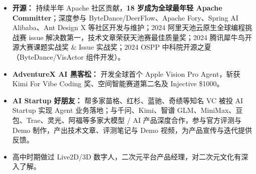 \documentclass[10pt]{article}
\begin{document}
\begin{itemize}
\item \textbf{开源：} 持续半年 Apache 社区贡献，\textbf{18 岁成为全球最年轻 Apache Committer}；深度参与 ByteDance/DeerFlow、Apache Fory、Spring AI Alibaba、Ant Design X 等社区开发与维护；2024 阿里天池云原生全球编程挑战赛 issue 解决数第一，技术文章荣获天池赛最佳质量奖；2024 腾讯犀牛鸟开源大赛课题实战奖 \& Issue 实战奖；2024 OSPP 中科院开源之夏（ByteDance/VisActor 组件开发）。
\item \textbf{AdventureX AI 黑客松：} 开发全球首个 Apple Vision Pro Agent，斩获 Kimi For Vibe Coding 奖、空间智能赛道第二名及 Injective \$1000。
\item \textbf{AI Startup 好朋友：} 帮多家苗格、红杉、蓝驰、奇绩等知名 VC 被投 AI Startup 实现 Agent 业务落地；与千问、Kimi、智谱 GLM、MiniMax、豆包、Trae、灵光、阿福等多家大模型 / AI 产品深度合作，参与官方评测与 Demo 制作，产出技术文章、评测笔记与 Demo 视频，为产品宣传与迭代提供反馈。
\item 高中时期做过 Live2D/3D 数字人，二次元平台产品经理，对二次元文化有深入了解。
\end{itemize}
\end{document}
